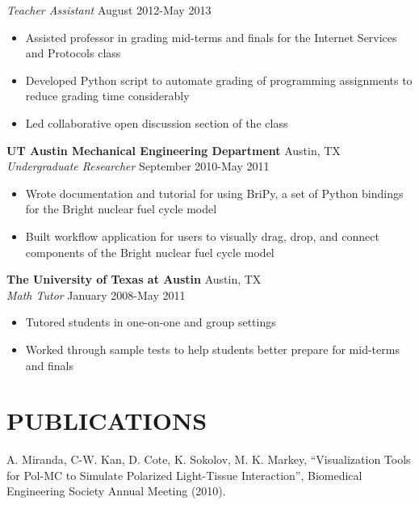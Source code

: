 \documentclass[line,margin,letterpaper]{res}
\begin{document}
\begin{resume}
  \emph{Teacher Assistant} \hfill August 2012-May 2013
  \begin{itemize} \itemsep -2pt
    \item Assisted professor in grading mid-terms and finals for the Internet 
    Services and Protocols class
    \item Developed Python script to automate grading of programming 
    assignments to reduce grading time considerably
    \item Led collaborative open discussion section of the class
  \end{itemize}
  {\bf UT Austin Mechanical Engineering Department} \hfill Austin, TX \\
  \emph{Undergraduate Researcher} \hfill September 2010-May 2011
  \begin{itemize} \itemsep -2pt
    \item Wrote documentation and tutorial for using BriPy, a set of Python
    bindings for the Bright nuclear fuel cycle model
    \item Built workflow application for users to visually drag, drop, and 
    connect components of the Bright nuclear fuel cycle model
  \end{itemize}
  {\bf The University of Texas at Austin} \hfill Austin, TX \\
  \emph{Math Tutor} \hfill January 2008-May 2011
  \begin{itemize} \itemsep -2pt
    \item Tutored students in one-on-one and group settings
    \item Worked through sample tests to help students better prepare for 
    mid-terms and finals
  \end{itemize}
 
\section{PUBLICATIONS} 
  A. Miranda, C-W. Kan, D. Cote, K. Sokolov, M. K. Markey, ``Visualization 
  Tools for Pol-MC to Simulate Polarized Light-Tissue Interaction'', 
  Biomedical Engineering Society Annual Meeting (2010).


\end{resume}
\end{document}
